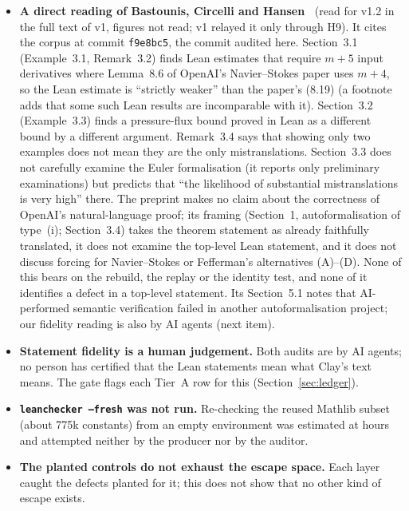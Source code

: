 \documentclass[10pt]{article}
\newcommand{\lean}[1]{\texttt{#1}}
\renewcommand{\_}{\textunderscore\allowbreak}
\begin{document}
\begin{itemize}
\item \textbf{A direct reading of Bastounis, Circelli and Hansen~\cite{bch}} (read for v1.2 in the full text of v1, figures not read; v1 relayed it only through H9). It cites the corpus at commit \texttt{f9e8bc5}, the commit audited here. Section~3.1 (Example~3.1, Remark~3.2) finds Lean estimates that require $m+5$ input derivatives where Lemma~8.6 of OpenAI's Navier--Stokes paper uses $m+4$, so the Lean estimate is ``strictly weaker'' than the paper's (8.19) (a footnote adds that some such Lean results are incomparable with it). Section~3.2 (Example~3.3) finds a pressure-flux bound proved in Lean as a different bound by a different argument. Remark~3.4 says that showing only two examples does not mean they are the only mistranslations. Section~3.3 does not carefully examine the Euler formalisation (it reports only preliminary examinations) but predicts that ``the likelihood of substantial mistranslations is very high'' there. The preprint makes no claim about the correctness of OpenAI's natural-language proof; its framing (Section~1, autoformalisation of type~(i); Section~3.4) takes the theorem statement as already faithfully translated, it does not examine the top-level Lean statement, and it does not discuss forcing for Navier--Stokes or Fefferman's alternatives (A)--(D). None of this bears on the rebuild, the replay or the identity test, and none of it identifies a defect in a top-level statement. Its Section~5.1 notes that AI-performed semantic verification failed in another autoformalisation project; our fidelity reading is also by AI agents (next item).
\item \textbf{Statement fidelity is a human judgement.} Both audits are by AI agents; no person has certified that the Lean statements mean what Clay's text means. The gate flags each Tier~A row for this (Section~\ref{sec:ledger}).
\item \textbf{\lean{leanchecker --fresh} was not run.} Re-checking the reused Mathlib subset (about 775k constants) from an empty environment was estimated at hours and attempted neither by the producer nor by the auditor.
\item \textbf{The planted controls do not exhaust the escape space.} Each layer caught the defects planted for it; this does not show that no other kind of escape exists.
\end{itemize}
\end{document}
